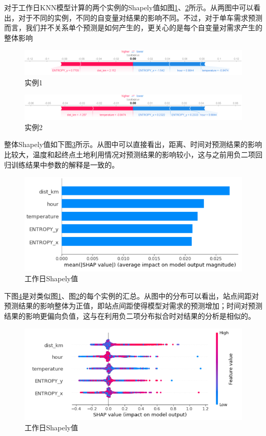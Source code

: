 \documentclass[]{tongjithesis}
\numberwithin{equation}{chapter}
\begin{document}
对于工作日KNN模型计算的两个实例的Shapely值如图\ref{ex1}、\ref{ex2}所示。从两图中可以看出，对于不同的实例，不同的自变量对结果的影响不同。不过，对于单车需求预测而言，我们并不关系单个预测是如何产生的，更关心的是每个自变量对需求产生的整体影响
\begin{figure}[H]
	\centering
	\includegraphics[width= 0.8 \textwidth]{figures_main/ex_weekday1.png}
	\caption{实例1}
	\label{ex1}
\end{figure}

\begin{figure}[H]
	\centering
	\includegraphics[width= 0.8 \textwidth]{figures_main/ex_weekday2.png}
	\caption{实例2}
	\label{ex2}
\end{figure}

整体Shapely值如下图\ref{weekday_shap1}所示。从图中可以直接看出，距离、时间对预测结果的影响比较大，温度和起终点土地利用情况对预测结果的影响较小，这与之前用负二项回归训练结果中参数的解释是一致的。
\begin{figure}[H]
	\centering
	\includegraphics[width= 0.9 \textwidth]{figures_main/shape_weekday.png}
	\caption{工作日Shapely值}
	\label{weekday_shap1}
\end{figure}

下图\ref{weekday_shap2}是对类似图\ref{ex1}、图\ref{ex2}的每个实例的汇总。从图中的分布可以看出，站点间距对预测结果的影响整体为正值，即站点间距使得模型对需求的预测增加；时间对预测结果的影响更偏向负值，这与在利用负二项分布拟合时对结果的分析是相似的。
\begin{figure}[H]
	\centering
	\includegraphics[width= 0.9 \textwidth]{figures_main/shap1_weekday.png}
	\caption{工作日Shapely值}
	\label{weekday_shap2}
\end{figure}
\clearpage
\end{document}
